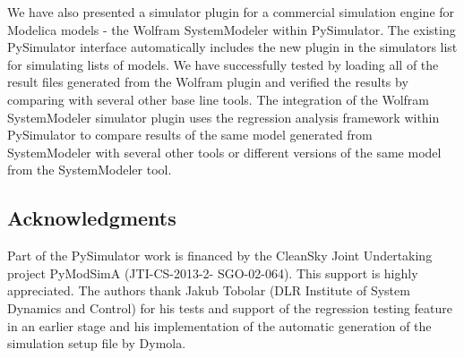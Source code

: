 We have also presented a simulator plugin for a commercial simulation engine for Modelica models - the Wolfram SystemModeler within PySimulator. The existing PySimulator interface automatically includes the new plugin in the simulators list for simulating lists of models. We have successfully tested by loading all of the result files generated from the Wolfram plugin and verified the results by comparing with several other base line tools. The integration of the Wolfram SystemModeler simulator plugin uses the regression analysis framework within PySimulator to compare results of the same model generated from SystemModeler with several other tools or different versions of the same model from the SystemModeler tool.

\subsection*{Acknowledgments}
\label{sec:pythonacknowledgments}

Part of the PySimulator work is financed by the CleanSky Joint Undertaking project PyModSimA (JTI-CS-2013-2-
SGO-02-064). This support is highly appreciated. The authors thank Jakub Tobolar (DLR
Institute of System Dynamics and Control) for his tests and support of the regression testing feature in an
earlier stage and his implementation of the automatic generation of the simulation setup file by Dymola.





